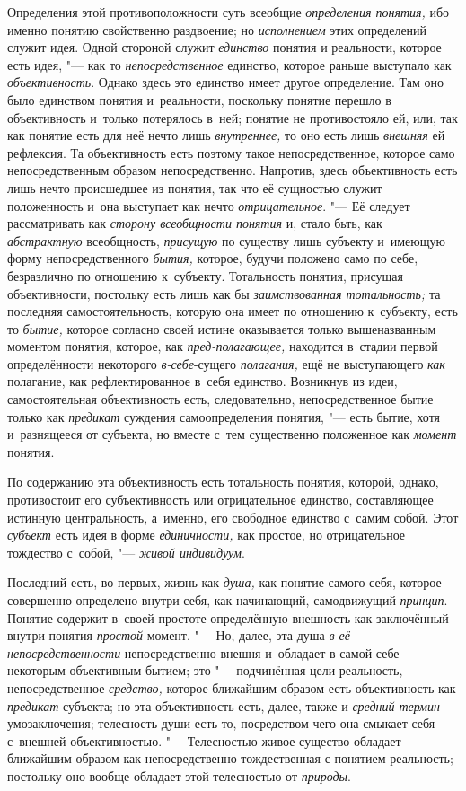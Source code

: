 Определения этой противоположности суть всеобщие {\em определения понятия,}
ибо именно понятию свойственно раздвоение; но {\em исполнением} этих
определений служит идея. Одной стороной служит {\em единство} понятия и
реальности, которое есть идея, "--- как то {\em непосредственное}
единство, которое раньше выступало как {\em объективность}.
Однако здесь это единство имеет другое определение. Там оно
было единством понятия и~реальности, поскольку понятие перешло в
объективность и~только потерялось в~ней; понятие не противостояло ей, или,
так как понятие есть для неё нечто лишь
{\em внутреннее,} то оно есть лишь {\em внешняя}
ей рефлексия. Та объективность есть поэтому такое
непосредственное, которое само непосредственным образом непосредственно.
Напротив, здесь объективность есть лишь нечто происшедшее из понятия, так
что её сущностью служит положенность и~она выступает как нечто
{\em отрицательное}. "--- Её следует рассматривать как {\em сторону
всеобщности понятия} и, стало бьть, как {\em абстрактную}
всеобщность, {\em присущую} по
существу лишь субъекту и~имеющую форму непосредственного {\em бытия,} которое,
будучи положено само по себе, безразлично по отношению к~субъекту.
Тотальность понятия, присущая объективности, постольку есть лишь как бы
{\em заимствованная тотальность;}
та последняя самостоятельность, которую она
имеет по отношению к~субъекту, есть то {\em бытие,} которое
согласно своей истине оказывается только вышеназванным моментом понятия,
которое, как {\em пред-полагающее,}
находится в~стадии первой определённости некоторого
{\em в-себе}-сущего {\em полагания,} ещё не выступающего {\em как}
полагание, как рефлектированное в~себя единство. Возникнув
из идеи, самостоятельная объективность есть, следовательно,
непосредственное бытие только как {\em предикат} суждения
самоопределения понятия, "--- есть бытие, хотя и~разнящееся от
субъекта, но вместе с~тем существенно положенное как {\em момент} понятия.

По содержанию эта объективность есть тотальность понятия,
которой, однако, противостоит его субъективность или отрицательное
единство, составляющее истинную центральность, а~именно, его свободное
единство с~самим собой. Этот {\em субъект} есть идея в
форме {\em единичности,} как простое, но отрицательное тождество
с~собой, "--- {\em живой индивидуум}.

Последний есть, во-первых, жизнь как {\em душа,} как понятие
самого себя, которое совершенно определено внутри себя, как начинающий,
самодвижущий {\em принцип}.
Понятие содержит в~своей простоте определённую внешность как
заключённый внутри понятия
{\em простой} момент. "---
Но, далее, эта душа {\em в
её непосредственности} непосредственно внешня и~обладает в
самой себе некоторым объективным бытием; это "--- подчинённая
цели реальность, непосредственное
{\em средство,} которое
ближайшим образом есть объективность как
{\em предикат} субъекта;
но эта объективность есть, далее, также и
{\em средний термин}
умозаключения; телесность души есть то, посредством чего она
смыкает себя с~внешней объективностью. "--- Телесностью живое
существо обладает ближайшим образом как непосредственно тождественная с
понятием реальность; постольку оно вообще обладает этой телесностью от
{\em природы}.

